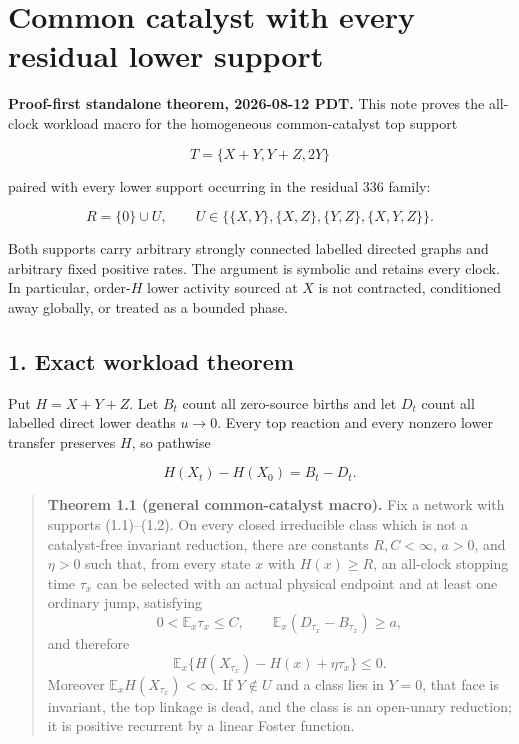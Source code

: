 \section{Common catalyst with every residual lower
support}

\textbf{Proof-first standalone theorem, 2026-08-12 PDT.} This note
proves the all-clock workload macro for the homogeneous common-catalyst
top support

\[
                         T=\{X+Y,Y+Z,2Y\}              \tag{1.1}
\]

paired with every lower support occurring in the residual 336 family:

\[
 R=\{0\}\cup U,\qquad
 U\in\big\{\{X,Y\},\{X,Z\},\{Y,Z\},\{X,Y,Z\}\big\}. \tag{1.2}
\]

Both supports carry arbitrary strongly connected labelled directed
graphs and arbitrary fixed positive rates. The argument is symbolic and
retains every clock. In particular, order-\(H\) lower activity sourced
at \(X\) is not contracted, conditioned away globally, or treated as a
bounded phase.

\subsection{1. Exact workload theorem}

Put \(H=X+Y+Z\). Let \(B_t\) count all zero-source births and let
\(D_t\) count all labelled direct lower deaths \(u\to0\). Every top
reaction and every nonzero lower transfer preserves \(H\), so pathwise

\[
                         H(X_t)-H(X_0)=B_t-D_t.         \tag{1.3}
\]

\begin{quote}
\textbf{Theorem 1.1 (general common-catalyst macro).} Fix a network with
supports (1.1)--(1.2). On every closed irreducible class which is not a
catalyst-free invariant reduction, there are constants \(R,C<\infty\),
\(a>0\), and \(\eta>0\) such that, from every state \(x\) with
\(H(x)\ge R\), an all-clock stopping time \(\tau_x\) can be selected
with an actual physical endpoint and at least one ordinary jump,
satisfying \[
      0<\mathbb E_x\tau_x\le C,\qquad
      \mathbb E_x(D_{\tau_x}-B_{\tau_x})\ge a,       \tag{1.4}
\] and therefore \[
 \mathbb E_x\{H(X_{\tau_x})-H(x)+\eta\tau_x\}\le0. \tag{1.5}
\] Moreover \(\mathbb E_xH(X_{\tau_x})<\infty\). If \(Y\notin U\) and a
class lies in \(Y=0\), that face is invariant, the top linkage is dead,
and the class is an open-unary reduction; it is positive recurrent by a
linear Foster function.
\end{quote}

